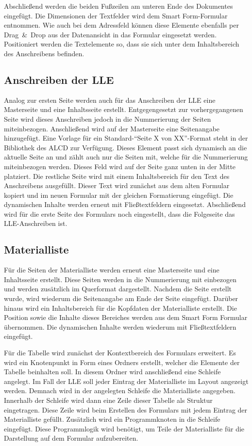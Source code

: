 Abschließend werden die beiden Fußzeilen am unteren Ende des Dokumentes eingefügt. Die Dimensionen der Textfelder wird dem Smart Form-Formular entnommen. Wie auch bei dem Adressfeld können diese Elemente ebenfalls per Drag~\&~Drop aus der Datenansicht in das Formular eingesetzt werden. Positioniert werden die Textelemente so, dass sie sich unter dem Inhaltsbereich des Anschreibens befinden.


\subsection{Anschreiben der \acs{LLE}}
	
Analog zur ersten Seite werden auch für das Anschreiben der \ac{LLE} eine Masterseite und eine Inhaltsseite erstellt. Entgegengesetzt zur vorhergegangenen Seite wird dieses Anschreiben jedoch in die Nummerierung der Seiten miteinbezogen. Anschließend wird auf der Masterseite eine Seitenangabe hinzugefügt. Eine Vorlage für ein Standard-"`Seite X von XX"'-Format steht in der Bibliothek des \ac{ALCD} zur Verfügung. Dieses Element passt sich dynamisch an die aktuelle Seite an und zählt auch nur die Seiten mit, welche für die Nummerierung miteinbezogen werden. Dieses Feld wird auf der Seite ganz unten in der Mitte platziert.
Die restliche Seite wird mit einem Inhaltsbereich für den Text des Anschreibens ausgefüllt. Dieser Text wird zunächst aus dem alten Formular kopiert und im neuen Formular mit der gleichen Formatierung eingefügt. Die dynamischen Inhalte werden erneut mit Fließtextfeldern eingesetzt. Abschließend wird für die erste Seite des Formulars noch eingestellt, dass die Folgeseite das \ac{LLE}-Anschreiben ist. 
	
	
	\FloatBarrier
\subsection{Materialliste}

Für die Seiten der Materialliste werden erneut eine Masterseite und eine Inhaltsseite erstellt. Diese Seiten werden in die Nummerierung mit einbezogen und werden zusätzlich im Querformat dargestellt. Nachdem die Seite erstellt wurde, wird wiederum die Seitenangabe am Ende der Seite eingefügt. Darüber hinaus wird ein Inhaltsbereich für die Kopfdaten der Materialliste erstellt. Die Position sowie die Inhalte dieses Bereiches werden aus dem Smart Form Formular übernommen. Die dynamischen Inhalte werden wiederum mit Fließtextfeldern eingefügt. 

Für die Tabelle wird zunächst der Kontextbereich des Formulars erweitert. Es wird ein Knotenpunkt in Form eines Ordners erstellt, welcher die Elemente der Tabelle beinhalten soll. In diesem Ordner wird anschließend eine Schleife angelegt. Im Fall der \ac{LLE} soll jeder Eintrag der Materialliste im Layout angezeigt werden. Demnach wird in der angelegten Schleife die Materialliste angegeben. Innerhalb der Schleife wird dann eine Zeile dieser Tabelle als Struktur eingetragen. Diese Zeile wird beim Erstellen des Formulars mit jedem Eintrag der Materialliste gefüllt. Zusätzlich wird ein Programmknoten in die Schleife eingefügt. Diese Programmlogik wird benötigt, um Teile der Materialliste für die Darstellung auf dem Formular aufzubereiten.

